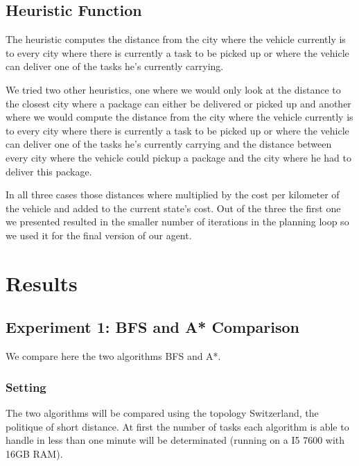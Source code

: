 \documentclass[11pt]{article}
\begin{document}
\subsection{Heuristic Function}
The heuristic computes the distance from the city where the vehicle currently is to every city where there is currently a task to be picked up or where the vehicle can deliver one of the tasks he's currently carrying.

We tried two other heuristics, one where we would only look at the distance to the closest city where a package can either be delivered or picked up and another where we would compute the distance from the city where the vehicle currently is to every city where there is currently a task to be picked up or where the vehicle can deliver one of the tasks he's currently carrying and the distance between every city where the vehicle could pickup a package and the city where he had to deliver this package.

In all three cases those distances where multiplied by the cost per kilometer of the vehicle and added to the current state's cost. Out of the three the first one we presented resulted in the smaller number of iterations in the planning loop so we used it for the final version of our agent.
\section{Results}

\subsection{Experiment 1: BFS and A* Comparison}
We compare here the two algorithms BFS and A*. 

\subsubsection{Setting}
The two algorithms will be compared using the topology Switzerland, the politique of short distance. At first the number of tasks each algorithm is able to handle in less than one minute will be determinated (running on a I5 7600 with 16GB RAM).
\end{document}
